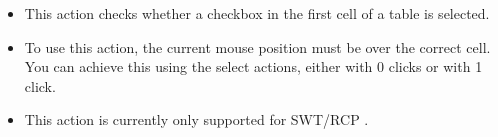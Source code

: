 
\begin{itemize}
\item This action checks whether a checkbox in the first cell of a table is selected. 
\item To use this action, the current mouse position must be over the correct cell. You can achieve this using the select actions, either with 0 clicks or with 1 click. 
\item This action is currently only supported for SWT/RCP \gdauts{}.
\end{itemize}
